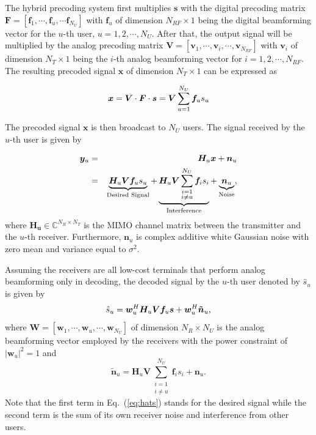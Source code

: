 \documentclass[conference]{IEEEtran}
\begin{document}
The hybrid precoding system first multiplies ${\bm s}$ with the digital precoding matrix $\bm{F}=\left[{\bm f}_1,\cdots,{\bm f}_u,\cdots{\bm f}_{N_U}\right]$ with ${\bm f}_u$ of dimension $N_{RF}\times 1$ being the digital beamforming vector for the $u$-th user, $u=1,2,\cdots,N_U$. After that, the output signal will be multiplied by the analog precoding matrix $\bm{V}=\left[{\bm v}_1,\cdots,{\bm v}_i,\cdots,{\bm v}_{N_{RF}}\right]$ with ${\bm v}_i$ of dimension $N_T\times 1$ being the $i$-th analog beamforming vector for $i=1,2,\cdots,N_{RF}$. The resulting precoded signal $\bm x$ of dimension $N_T\times 1$  can be expressed as

\begin{equation}{\label{eq:transx1}}
{\bm x} = \bm{V}\cdot \bm{F}\cdot\bm{s}= \bm{V}\sum_{u=1}^{N_U}\bm{f}_us_u
\end{equation}

The precoded signal $\bm x$ is then broadcast to $N_U$ users. The signal received by the $u$-th user is given by

\begin{eqnarray}{\label{eq:transx2}}
{\bm y}_u &=& \bm{H}_u \bm{x} + \bm{n}_u \nonumber\\
&=&\underbrace{\bm{H}_u \bm{V}\bm{f}_us_u}_\text{Desired Signal}+\underbrace{\bm{H}_u \bm{V}\sum_{\substack{i=1 \\ i\neq u}}^{N_U}\bm{f}_is_i}_\text{Interference}+\underbrace{\bm{n}_u}_\text{Noise},
\end{eqnarray}
where $\bm{H_u}$$\in\mathbb{C}^{N_R\times N_T}$ is the MIMO channel matrix between the transmitter and the $u$-th receiver\cite{el2014spatially}. Furthermore, $\bm{n}_u$ is complex additive white Gaussian noise with zero mean and variance equal to $\sigma^2$.

Assuming the receivers are all low-cost terminals that perform analog beamforming only in decoding, the decoded signal by the $u$-th user denoted by $\hat{s}_u$ is given by
\begin{equation}{\label{eq:hats}}
\hat{s}_u = \bm{w}_u^H \bm{H}_u \bm{V} \bm{f}_{u} \bm{s} + \bm{w}_u^H \bm{\tilde{n}}_u,
\end{equation}
where  $\bm{W} = [\bm{w}_1,\cdots, \bm{w}_u,\cdots, \bm{w}_{N_U}]$ of dimension $N_R\times N_U$ is the analog beamforming vector employed by the receivers with the power constraint of $|\bm{w}_u|^2=1$ and
\begin{equation}
\bm{\tilde{n}}_u=\bm{H}_u \bm{V}\sum_{\substack{i=1 \\ i\neq u}}^{N_U}\bm{f}_is_i+\bm{n}_u.
\end{equation}
Note that the first term in Eq.~(\ref{eq:hats}) stands for the desired signal while the second term is the sum of its own receiver noise and interference from other users.
\end{document}
